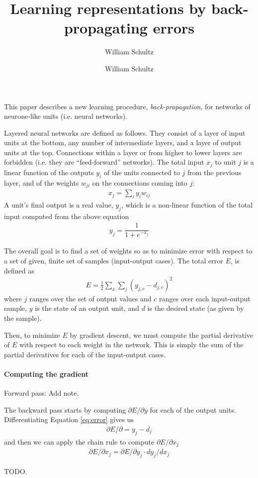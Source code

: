 \documentclass[10pt,a4paper]{article}
\author{William Schultz}
\begin{document}
\title{Learning representations by back-propagating errors}
\author{William Schultz}
\maketitle

This paper \cite{rumelhart1986learning} describes a new learning procedure, \textit{back-propagation}, for networks of neurone-like units (i.e. neural networks).
 
Layered neural networks are defined as follows. They consist of a layer of input units at the bottom, any number of intermediate layers, and a layer of output units at the top. Connections within a layer or from higher to lower layers are forbidden (i.e. they are ``feed-forward'' networks). The total input $x_j$ to unit $j$ is a linear function of the outputs $y_i$ of the units connected to $j$ from the previous layer, and of the weights $w_{ji}$ on the connections coming into $j$:
\begin{align}
    x_j = \sum_{i} y_i w_{ij}
\end{align}
A unit's final output is a real value, $y_j$, which is a non-linear function of the total input computed from the above equation
\begin{align}
    y_j = \dfrac{1}{1+e^{-x_j}}
\end{align}

The overall goal is to find a set of weights so as to minimize error with respect to a set of given, finite set of samples (input-output cases). The total error $E$, is defined as
\begin{align}
    E = \frac{1}{2} \sum_{x}\sum_{j} (y_{j,c} - d_{j,c})^2
    \label{eq:error}
\end{align}
where $j$ ranges over the set of output values and $c$ ranges over each input-output sample, $y$ is the state of an output unit, and $d$ is the desired state (as given by the sample).

Then, to minimize $E$ by gradient descent, we must compute the partial derivative of $E$ with respect to each weight in the network. This is simply the sum of the partial derivatives for each of the input-output cases.

\paragraph*{Computing the gradient}

Forward pass: Add note.

The backward pass starts by computing $\partial E / \partial y$ for each of the output units. Differentiating Equation \ref{eq:error} gives us 
\begin{align*}
    \partial E / \partial = y_j - d_j
\end{align*}
and then we can apply the chain rule to compute $\partial E / \partial x_j$
\begin{align*}
    \partial E / \partial x_j = \partial E / \partial y_j \cdot dy_j / dx_j
\end{align*}

TODO.



\end{document}
